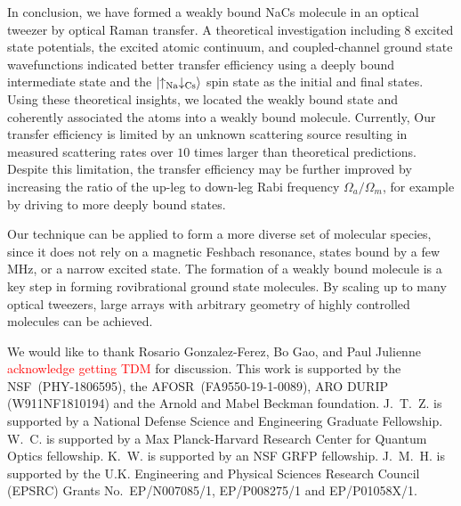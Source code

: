 \documentclass[aps,prl,twocolumn,10pt,superscriptaddress]{revtex4-1}
\newcommand{\Na}{\mathrm{Na}}
\newcommand{\Cs}{\mathrm{Cs}}
\newcommand{\todo}[1]{}
\begin{document}
In conclusion, we have formed a weakly bound NaCs molecule in an optical tweezer
by optical Raman transfer.
A theoretical investigation including 8 excited state potentials,
the excited atomic continuum, and coupled-channel ground state wavefunctions indicated
better transfer efficiency using a deeply bound intermediate state
and the $\ket{\uparrow_{\Na} \downarrow_{\Cs} }$ spin state as the initial and final states.
Using these theoretical insights, we located the weakly bound state
and coherently associated the atoms into a weakly bound molecule. Currently,
Our transfer efficiency is limited by an unknown scattering source
resulting in measured scattering rates over $10$ times larger than theoretical predictions.
Despite this limitation, the transfer efficiency may be further improved
by increasing the ratio of the up-leg to down-leg Rabi frequency
$\Omega_a/\Omega_m$, for example by driving to more deeply bound states.

Our technique can be applied to form a more diverse set of molecular species,
since it does not rely on a magnetic Feshbach resonance, states bound by a few MHz,
or a narrow excited state. The formation of a weakly bound molecule is a key step
in forming rovibrational ground state molecules. By scaling up to many optical tweezers\cite{Endres2016, Barredo2018, PhysRevX.8.041055, PhysRevLett.122.203601}, large arrays with arbitrary geometry of highly controlled molecules can be achieved.

\todo{sm: STIRAP vs Raman}

\begin{acknowledgments}
  We would like to thank Rosario Gonzalez-Ferez, Bo Gao, and Paul Julienne \textcolor{red}{acknowledge getting TDM} for discussion. This work is supported by the NSF~(PHY-1806595), the AFOSR~(FA9550-19-1-0089), ARO DURIP (W911NF1810194) and the Arnold and Mabel Beckman foundation. J.~T.~Z. is supported by a National Defense Science and Engineering Graduate Fellowship. W.~C. is supported by a Max Planck-Harvard Research Center for Quantum Optics fellowship. K.~W. is supported by an NSF GRFP fellowship. J.~M.~H. is supported by the U.K. Engineering and Physical Sciences Research Council (EPSRC) Grants No.\ EP/N007085/1, EP/P008275/1 and EP/P01058X/1.
\end{acknowledgments}



\end{document}
